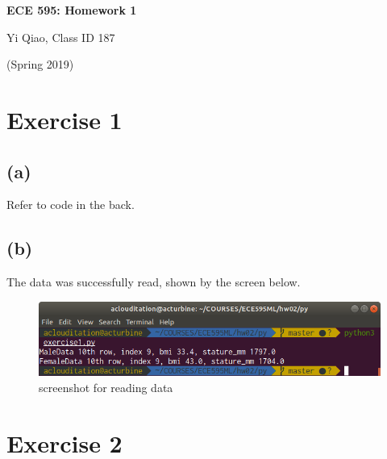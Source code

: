 \documentclass[11pt]{article}
\begin{document}
\begin{center}
\Large{\textbf{ECE 595: Homework 1}}

Yi Qiao, Class ID 187

(Spring 2019)
\end{center}

\section*{Exercise 1}
\subsection*{(a)}
Refer to code in the back. 
\subsection*{(b)}
The data was successfully read, shown by the screen below.
\begin{figure}[h]
	\centering
	\includegraphics[width=0.7\linewidth]{exercise1.png}
	\caption{screenshot for reading data}
\end{figure}

\section*{Exercise 2}
\end{document}
